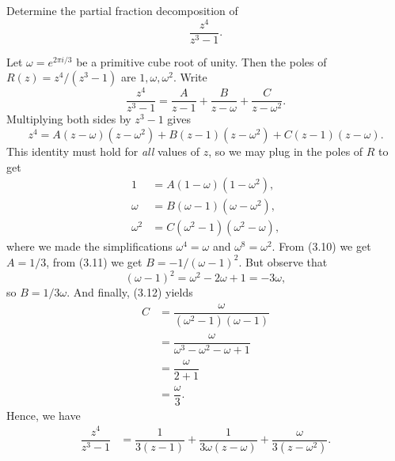 \begin{exercise}
	Determine the partial fraction decomposition of $$\dfrac{z^4}{z^3-1}.$$
	
	\begin{sol}
		Let $\omega=e^{2\pi i/3}$ be a primitive cube root of unity. Then the poles of $R(z)=z^4/(z^3-1)$ are $1,\omega,\omega^2$. Write $$\dfrac{z^4}{z^3-1}=\dfrac{A}{z-1}+\dfrac{B}{z-\omega}+\dfrac{C}{z-\omega^2}.$$ Multiplying both sides by $z^3-1$ gives $$z^4=A(z-\omega)(z-\omega^2)+B(z-1)(z-\omega^2)+C(z-1)(z-\omega).$$ This identity must hold for \textit{all} values of $z$, so we may plug in the poles of $R$ to get
		\begin{align}
			1 &=A(1-\omega)(1-\omega^2), \\
			\omega &=B(\omega-1)(\omega-\omega^2), \\
			\omega^2 &=C(\omega^2-1)(\omega^2-\omega),
		\end{align}
		where we made the simplifications $\omega^4=\omega$ and $\omega^8=\omega^2$. From (3.10) we get $A=1/3$, from (3.11) we get $B=-1/(\omega-1)^2$. But observe that $$(\omega-1)^2=\omega^2-2\omega+1=-3\omega,$$ so $B=1/3\omega$. And finally, (3.12) yields
		\begin{align*}
			C &=\dfrac{\omega}{(\omega^2-1)(\omega-1)} \\
			&=\dfrac{\omega}{\omega^3-\omega^2-\omega+1} \\
			&=\dfrac{\omega}{2+1} \\
			&=\dfrac{\omega}{3}.
		\end{align*}
		Hence, we have
		\begin{align*}
			\dfrac{z^4}{z^3-1} &=\dfrac{1}{3(z-1)}+\dfrac{1}{3\omega(z-\omega)}+\dfrac{\omega}{3(z-\omega^2)}.
		\end{align*}
	\end{sol}
\end{exercise}

